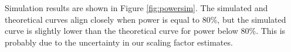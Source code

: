 Simulation results are shown in Figure \ref{fig:powersim}. The simulated and theoretical curves align closely when power is equal to 80\%, but the simulated curve is slightly lower than the theoretical curve for power below 80\%. This is probably due to the uncertainty in our scaling factor estimates.